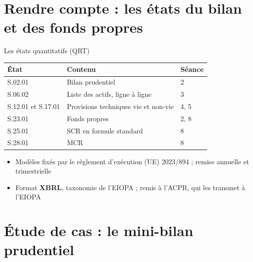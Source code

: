 \documentclass[10pt,aspectratio=169]{beamer}
\begin{document}
\section{Rendre compte : les états du bilan et des fonds propres}

\begin{frame}{Les états quantitatifs (QRT)}
\begin{table}
\centering
\small
\renewcommand{\arraystretch}{1.3}
\begin{tabular}{lll}
\toprule
\textbf{État} & \textbf{Contenu} & \textbf{Séance} \\
\midrule
S.02.01 & Bilan prudentiel & 2 \\
S.06.02 & Liste des actifs, ligne à ligne & 3 \\
S.12.01 et S.17.01 & Provisions techniques vie et non-vie & 4, 5 \\
S.23.01 & Fonds propres & 2, 8 \\
S.25.01 & SCR en formule standard & 8 \\
S.28.01 & MCR & 8 \\
\bottomrule
\end{tabular}
\end{table}
\begin{itemize}
  \item Modèles fixés par le règlement d'exécution (UE) 2023/894 ; remise annuelle et trimestrielle
  \item Format \textbf{XBRL}, taxonomie de l'EIOPA ; remis à l'ACPR, qui les transmet à l'EIOPA
\end{itemize}
\end{frame}

\section{Étude de cas : le mini-bilan prudentiel}
\end{document}
